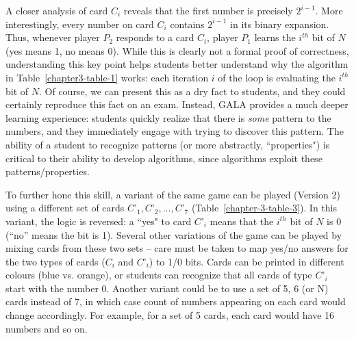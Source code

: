 \begin{multicols}{2}
A closer analysis of card $C_{i}$ reveals that the first number is precisely $2^{i-1}$. More interestingly, every number on card $C_{i}$ contains $2^{i-1}$ in its binary expansion. Thus, whenever player $P_{2}$ responds to a card $C_{i}$, player $P_{1}$ learns the $i^{th}$ bit of $N$ (yes means 1, no means 0). While this is clearly not a formal proof of correctness, understanding this key point helps students better understand why the algorithm in Table~\ref{chapter3-table-1} works: each iteration $i$ of the loop is evaluating the $i^{th}$ bit of $N$. Of course, we can present this as a dry fact to students, and they could certainly reproduce this fact on an exam. Instead, GALA provides a much deeper learning experience: students quickly realize that there is \textit{some} pattern to the numbers, and they immediately engage with trying to discover this pattern. The ability of a student to recognize patterns (or more abstractly, ``properties") is critical to their ability to develop algorithms, since algorithms exploit these patterns/properties.
 
To further hone this skill, a variant of the same game can be played (Version 2) using a different set of cards $C’_{1}, C’_{2},..., C’_{7}$ (Table~\ref{chapter-3-table-3}). In this variant, the logic is reversed: a ``yes" to card $C’_{i}$ means that the $i^{th}$ bit of $N$ is $0$ (“no” means the bit is 1). Several other variations of the game can be played by mixing cards from these two sets – care must be taken to map yes/no answers for the two types of cards ($C_{i}$ and $C’_{i}$) to 1/0 bits. Cards can be printed in different colours (blue vs. orange), or students can recognize that all cards of type $C’_{i}$ start with the number 0. Another variant could be to use a set of 5, 6 (or N) cards instead of 7, in which case count of numbers appearing on each card would change accordingly. For example, for a set of 5 cards, each card would have 16 numbers and so on. 
 
\begin{table}[H]

\vspace{-.3cm}


\end{table}
\end{multicols}
